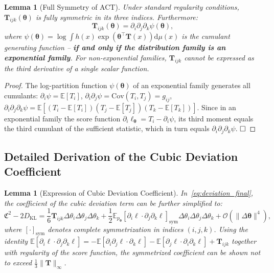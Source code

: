 \documentclass[12pt,a4paper]{article}
\theoremstyle{plain}
\newtheorem{lemma}[theorem]{Lemma}
\theoremstyle{definition}
\theoremstyle{remark}
\newcommand{\E}{\mathbb{E}}
\newcommand{\Cov}{\mathrm{Cov}}
\newcommand{\dd}{\mathrm{d}}
\newcommand{\DKL}{D_{\mathrm{KL}}}
\newcommand{\CercisScore}{\mathfrak{C}}
\newcommand{\ACT}{\mathbf{T}}    %
\begin{document}
\begin{lemma}[Full Symmetry of ACT]
\label{lem:ACT_symmetry}
Under standard regularity conditions, $\ACT_{ijk}(\bm{\theta})$ is fully symmetric in its three indices. Furthermore:
\begin{equation}\label{eq:ACT_symmetry}
    \ACT_{ijk}(\bm{\theta}) = \partial_i \partial_j \partial_k \psi(\bm{\theta}),
\end{equation}
where $\psi(\bm{\theta}) = \log \int h(x) \exp(\bm{\theta}^\top \mathbf{T}(x)) \dd\mu(x)$ is the cumulant generating function -- \textbf{if and only if the distribution family is an exponential family}. For non-exponential families, $\ACT_{ijk}$ cannot be expressed as the third derivative of a single scalar function.
\end{lemma}

\begin{proof}
The log-partition function $\psi(\bm{\theta})$ of an exponential family generates all cumulants: $\partial_i \psi = \E[T_i]$, $\partial_i \partial_j \psi = \Cov(T_i, T_j) = g_{ij}$, $\partial_i \partial_j \partial_k \psi = \E[(T_i - \E[T_i])(T_j - \E[T_j])(T_k - \E[T_k])]$. Since in an exponential family the score function $\partial_i \ell_{\bm{\theta}} = T_i - \partial_i \psi$, its third moment equals the third cumulant of the sufficient statistic, which in turn equals $\partial_i \partial_j \partial_k \psi$. $\hfill\square$
\end{proof}

\subsection{Detailed Derivation of the Cubic Deviation Coefficient}

\begin{lemma}[Expression of Cubic Deviation Coefficient]
\label{lem:cubic_coeff}
In~\eqref{eq:deviation_final}, the coefficient of the cubic deviation term can be further simplified to:
\begin{equation}\label{eq:cubic_coeff_final}
    \CercisScore^2 - 2\DKL = \frac{1}{6}\ACT_{ijk} \Delta\theta_i\Delta\theta_j\Delta\theta_k
    + \frac{1}{2} \E_{p_{\bm{\theta}}}[\partial_i \ell \cdot \partial_j \partial_k \ell]_{\mathrm{sym}} \Delta\theta_i\Delta\theta_j\Delta\theta_k
    + \mathcal{O}(\|\Delta\bm{\theta}\|^4),
\end{equation}
where $[\cdot]_{\mathrm{sym}}$ denotes complete symmetrization in indices $(i,j,k)$. Using the identity $\E[\partial_i\ell \cdot \partial_j\partial_k\ell] = -\E[\partial_i\partial_j\ell \cdot \partial_k\ell] - \E[\partial_j\ell \cdot \partial_i\partial_k\ell] + \ACT_{ijk}$ together with regularity of the score function, the symmetrized coefficient can be shown not to exceed $\frac{1}{3}\|\ACT\|_{\infty}$.
\end{lemma}
\end{document}
